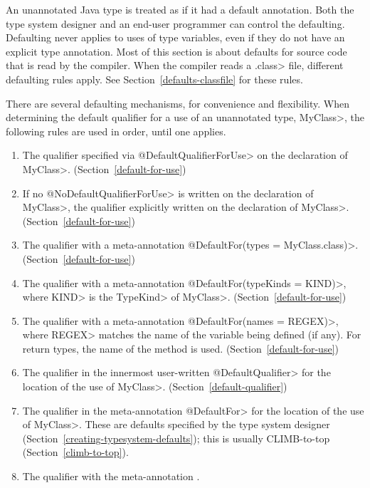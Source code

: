 

An unannotated
Java type is treated as if it had a default annotation.
Both the type system designer and an end-user programmer can control the defaulting.
Defaulting never applies to uses of type variables, even if they do not
have an explicit type annotation.
Most of this section is about defaults for source code that is read by
the compiler.  When the compiler reads a \<.class> file, different
defaulting rules apply.
See Section~\ref{defaults-classfile} for these rules.

There are several defaulting mechanisms, for convenience and flexibility.
When determining the default qualifier for a use of an unannotated type, \<MyClass>, the following
rules are used in order, until one applies.

\begin{enumerate}
\item
  The qualifier specified via \<@DefaultQualifierForUse> on the declaration of \<MyClass>.
  (Section~\ref{default-for-use})
\item
  If no \<@NoDefaultQualifierForUse> is written on the declaration of \<MyClass>, the qualifier
  explicitly written on the declaration of \<MyClass>. (Section~\ref{default-for-use})
\item
  The qualifier with a meta-annotation \<@DefaultFor(types = MyClass.class)>. (Section~\ref{default-for-use})
\item
  The qualifier with a meta-annotation \<@DefaultFor(typeKinds = KIND)>, where \<KIND> is the
  \<TypeKind> of \<MyClass>. (Section~\ref{default-for-use})
\item
  The qualifier with a meta-annotation \<@DefaultFor(names = REGEX)>, where \<REGEX>
  matches the name of the variable being defined (if any).  For return types, the name of
  the method is used. (Section~\ref{default-for-use})
\item
  The qualifier in the innermost user-written \<@DefaultQualifier> for the location of the use of \<MyClass>.
  (Section~\ref{default-qualifier})
\item
  The qualifier in the meta-annotation \<@DefaultFor> for the location of the use of \<MyClass>.
  These are defaults specified by the type system designer (Section~\ref{creating-typesystem-defaults});
  this is usually CLIMB-to-top (Section~\ref{climb-to-top}).
\item
  The qualifier with the meta-annotation .
\end{enumerate}

